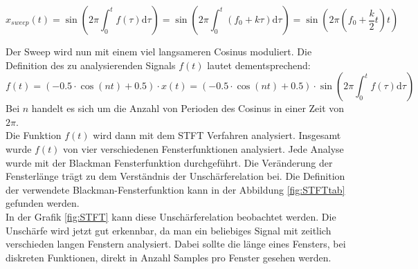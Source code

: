 \begin{equation}
x_{sweep}(t)=\sin \left(2 \pi \int_{0}^{t} f(\tau) \mathrm{d} \tau\right)=\sin \left(2 \pi \int_{0}^{t}\left(f_{0}+k \tau\right) \mathrm{d} \tau\right)=\sin \left(2 \pi\left(f_{0}+\frac{k}{2} t\right) t\right)
\end{equation} 

Der Sweep wird nun mit einem viel langsameren Cosinus moduliert. Die Definition des zu analysierenden Signals $f(t)$ lautet dementsprechend:
\begin{equation}
f(t)= (-0.5\cdot \cos(nt)+0.5)\cdot x(t)=(-0.5\cdot \cos(nt)+0.5)\cdot \sin \left(2 \pi \int_{0}^{t} f(\tau) \mathrm{d} \tau\right)
\end{equation} \label{eq:sin-sweep}
Bei $n$ handelt es sich um die Anzahl von Perioden des Cosinus in einer Zeit von $2\pi$.\\
Die Funktion $f(t)$  wird dann mit dem STFT Verfahren analysiert. Insgesamt wurde $f(t)$ von vier verschiedenen Fensterfunktionen analysiert. Jede Analyse wurde mit der Blackman Fensterfunktion durchgeführt. Die Veränderung der Fensterlänge trägt zu dem Verständnis der Unschärferelation bei. Die Definition der verwendete Blackman-Fensterfunktion kann in der Abbildung \ref{fig:STFTtab} gefunden werden.\\


In der Grafik \ref{fig:STFT} kann diese Unschärferelation beobachtet werden. Die Unschärfe wird jetzt gut erkennbar, da man ein beliebiges Signal mit zeitlich verschieden langen Fenstern analysiert. Dabei sollte die länge eines Fensters, bei diskreten Funktionen, direkt in Anzahl Samples pro Fenster gesehen werden.\\



